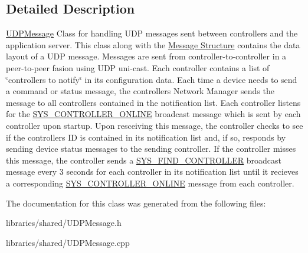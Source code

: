 \subsection{Detailed Description}
\hyperlink{class_u_d_p_message}{U\+D\+P\+Message}  Class for handling U\+DP messages sent between controllers and the application server. This class along with the \hyperlink{struct_u_d_p_message_struct}{Message Structure} contains the data layout of a U\+DP message. Messages are sent from controller-\/to-\/controller in a peer-\/to-\/peer fasion using U\+DP uni-\/cast. Each controller contains a list of \char`\"{}controllers to notify\char`\"{} in its configuration data. Each time a device needs to send a command or status message, the controller\textquotesingle{}s Network Manager sends the message to all controllers contained in the notification list. Each controller listens for the \hyperlink{group___u_d_p_message_i_d_ga23aab89076591390a1dbc412a3a07314}{S\+Y\+S\+\_\+\+C\+O\+N\+T\+R\+O\+L\+L\+E\+R\+\_\+\+O\+N\+L\+I\+NE} broadcast message which is sent by each controller upon startup. Upon resceiving this message, the controller checks to see if the controller\textquotesingle{}s ID is contained in its notification list and, if so, responds by sending device status messages to the sending controller. If the controller misses this message, the controller sends a \hyperlink{group___u_d_p_message_i_d_gadfda0e5a5a6a08de555dd55182a4cd87}{S\+Y\+S\+\_\+\+F\+I\+N\+D\+\_\+\+C\+O\+N\+T\+R\+O\+L\+L\+ER} broadcast message every 3 seconds for each controller in its notification list until it recieves a corresponding \hyperlink{group___u_d_p_message_i_d_ga23aab89076591390a1dbc412a3a07314}{S\+Y\+S\+\_\+\+C\+O\+N\+T\+R\+O\+L\+L\+E\+R\+\_\+\+O\+N\+L\+I\+NE} message from each controller. 

The documentation for this class was generated from the following files\+:\begin{DoxyCompactItemize}
\item 
libraries/shared/U\+D\+P\+Message.\+h\item 
libraries/shared/U\+D\+P\+Message.\+cpp\end{DoxyCompactItemize}
